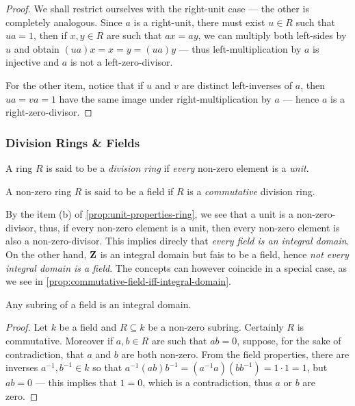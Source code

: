 %
\begin{proof}
We shall restrict ourselves with the right-unit case --- the other is completely
analogous. Since \(a\) is a right-unit, there must exist \(u \in R\) such that
\(u a = 1\), then if \(x, y \in R\) are such that \(a x = a y\), we can multiply
both left-sides by \(u\) and obtain \((u a) x = x = y = (u a) y\) --- thus
left-multiplication by \(a\) is injective and \(a\) is not a left-zero-divisor.

For the other item, notice that if \(u\) and \(v\) are distinct left-inverses of
\(a\), then \(u a = v a = 1\) have the same image under right-multiplication by
\(a\) --- hence \(a\) is a right-zero-divisor.
\end{proof}
%

\subsubsection{Division Rings \& Fields}

%
\begin{definition}
\label{def:division-ring}
A ring \(R\) is said to be a \emph{division ring} if \emph{every} non-zero
element is a \emph{unit}.
\end{definition}
%

%
\begin{definition}[Field]
\label{def:field}
A non-zero ring \(R\) is said to be a field if \(R\) is a \emph{commutative}
division ring.
\end{definition}
%

%
\begin{remark}
\label{rem:field-and-integral-domain}
By the item (b) of \cref{prop:unit-properties-ring}, we see that a unit is a
non-zero-divisor, thus, if every non-zero element is a unit, then every non-zero
element is also a non-zero-divisor. This implies direcly that \emph{every field
is an integral domain}. On the other hand, \(\mathbf{Z}\) is an integral domain but fais
to be a field, hence \emph{not every integral domain is a field}. The concepts
can however coincide in a special case, as we see in
\cref{prop:commutative-field-iff-integral-domain}.
\end{remark}
%

%
\begin{proposition}
\label{prop:subring-field-is-integral-domain}
Any subring of a field is an integral domain.
\end{proposition}
%

%
\begin{proof}
Let \(k\) be a field and \(R \subseteq k\) be a non-zero subring. Certainly
\(R\) is commutative. Moreover if \(a, b \in R\) are such that \(a b = 0\),
suppose, for the sake of contradiction, that \(a\) and \(b\) are both
non-zero. From the field properties, there are inverses \(a^{-1}, b^{-1} \in k\)
so that \(a^{-1}(a b) b^{-1} = (a^{-1} a) (b b^{-1}) = 1 \cdot 1 = 1\), but \(a
b = 0\) --- this implies that \(1 = 0\), which is a contradiction, thus \(a\) or
\(b\) are zero.
\end{proof}
%

